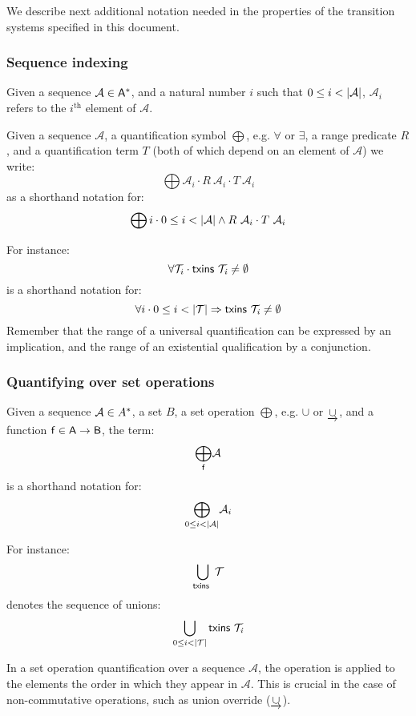 We describe next additional notation needed in the properties of the transition
systems specified in this document.

\subsubsection{Sequence indexing}
\label{sec:seq-indexing}

Given a sequence $\mathcal{A} \in \mathsf{A}^{*}$, and a natural number $i$
such that $0 \leq i < \left| \mathcal{A} \right|$, $\mathcal{A}_i$ refers to the
$i^{\text{th}}$ element of $\mathcal{A}$.


Given a sequence $\mathcal{A}$, a quantification symbol $\bigoplus$, e.g.
$\forall$ or $\exists$, a range predicate $R$, and a quantification term $T$
(both of which depend on an element of $\mathcal{A}$) we write:
%
$$
\bigoplus \mathcal{A}_i \cdot R~\mathcal{A}_i \cdot T~\mathcal{A}_i
$$
%
as a shorthand notation for:
%
$$
\bigoplus i \cdot 0 \leq i < \left| \mathcal{A} \right| \wedge R~\mathcal{A}_i \cdot T~\mathcal{A}_i
$$

For instance:
%
$$
\forall \mathcal{T}_i \cdot \mathsf{txins}~ \mathit{\mathcal{T}_i} \neq \emptyset
$$
is a shorthand notation for:
$$
\forall i \cdot 0 \leq i < \left| \mathcal{T} \right| \Rightarrow \mathsf{txins}~ \mathit{\mathcal{T}_i} \neq \emptyset
$$
Remember that the range of a universal quantification can be expressed by an
implication, and the range of an existential qualification by a conjunction.

\subsubsection{Quantifying over set operations}
\label{sec:quantifying-over-set-operators}

Given a sequence $\mathcal{A} \in A^{*}$, a set $B$, a set operation
$\bigoplus$, e.g. $\cup$ or $\mathbin{\underrightarrow\cup}$, and a function
$\mathsf{f} \in \mathsf{A} \to \mathsf{B}$, the term:
%
$$
\underset{\mathsf{f}}{\bigoplus} \mathcal{A}
$$
is a shorthand notation for:
%
$$
\underset{0 \leq i < \left| \mathcal{A} \right|}{\bigoplus} \mathcal{A}_i
$$

For instance:
$$
\bigcup_{\mathsf{txins}~ \mathit{}} \mathcal{T}
$$
denotes the sequence of unions:
$$
\bigcup_{0 \leq i < \left| \mathcal{T} \right|} \mathsf{txins}~ \mathit{\mathcal{T}_i}
$$

In a set operation quantification over a sequence $\mathcal{A}$, the operation
is applied to the elements the order in which they appear in $\mathcal{A}$.
This is crucial in the case of non-commutative operations, such as union
override ($\mathbin{\underrightarrow\cup}$).

